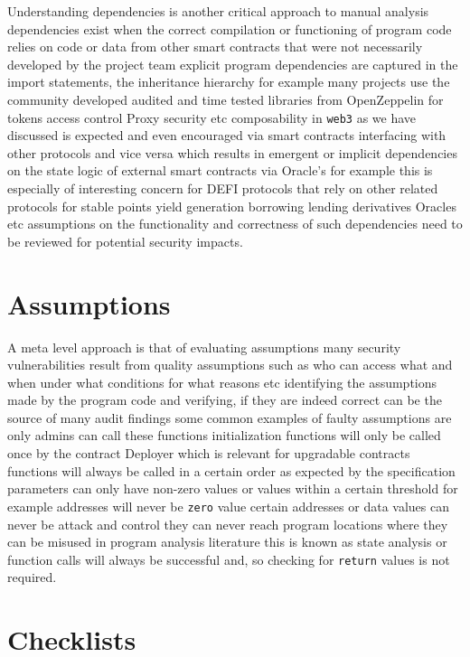 Understanding dependencies is another critical approach to manual analysis dependencies exist when the correct compilation or functioning of program code relies on code or data from other smart contracts that were not necessarily developed by the project team explicit program dependencies are captured in the import statements, the inheritance hierarchy for example many projects use the community developed audited and time tested libraries from OpenZeppelin for tokens access control Proxy security etc composability in \verb|web3| as we have discussed is expected and even encouraged via smart contracts interfacing with other protocols and vice versa which results in emergent or implicit dependencies on the state logic of external smart contracts via Oracle's for example this is especially of interesting concern for DEFI protocols that rely on other related protocols for stable points yield generation borrowing lending derivatives Oracles etc assumptions on the functionality and correctness of such dependencies need to be reviewed for potential security impacts.

\section{Assumptions}

A meta level approach is that of evaluating assumptions many security vulnerabilities result from quality assumptions such as who can access what and when under what conditions for what reasons etc identifying the assumptions made by the program code and verifying, if they are indeed correct can be the source of many audit findings some common examples of faulty assumptions are only admins can call these functions initialization functions will only be called once by the contract Deployer which is relevant for upgradable contracts functions will always be called in a certain order as expected by the specification parameters can only have non-zero values or values within a certain threshold for example addresses will never be \verb|zero| value certain addresses or data values can never be attack and control they can never reach program locations where they can be misused in program analysis literature this is known as state analysis or function calls will always be successful and, so checking for \verb|return| values is not required.

\section{Checklists}

